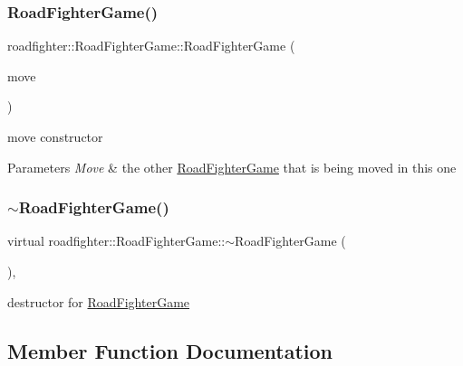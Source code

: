 \subsubsection{\texorpdfstring{Road\+Fighter\+Game()}{RoadFighterGame()}\hspace{0.1cm}{\footnotesize\ttfamily [4/4]}}
{\footnotesize\ttfamily roadfighter\+::\+Road\+Fighter\+Game\+::\+Road\+Fighter\+Game (\begin{DoxyParamCaption}\item[{\hyperlink{classroadfighter_1_1RoadFighterGame}{Road\+Fighter\+Game} \&\&}]{move }\end{DoxyParamCaption})\hspace{0.3cm}{\ttfamily [default]}}

move constructor 
\begin{DoxyParams}{Parameters}
{\em Move} & the other \hyperlink{classroadfighter_1_1RoadFighterGame}{Road\+Fighter\+Game} that is being moved in this one \\
\hline
\end{DoxyParams}
\mbox{\label{classroadfighter_1_1RoadFighterGame_ab7e8842d97c76acc3898eaab6ebacb69}} 
\subsubsection{\texorpdfstring{$\sim$\+Road\+Fighter\+Game()}{~RoadFighterGame()}}
{\footnotesize\ttfamily virtual roadfighter\+::\+Road\+Fighter\+Game\+::$\sim$\+Road\+Fighter\+Game (\begin{DoxyParamCaption}{ }\end{DoxyParamCaption})\hspace{0.3cm}{\ttfamily [virtual]}, {\ttfamily [default]}}

destructor for \hyperlink{classroadfighter_1_1RoadFighterGame}{Road\+Fighter\+Game} 

\subsection{Member Function Documentation}
\mbox{\label{classroadfighter_1_1RoadFighterGame_a2f0316e59725124039c8a6800a20461f}} 
